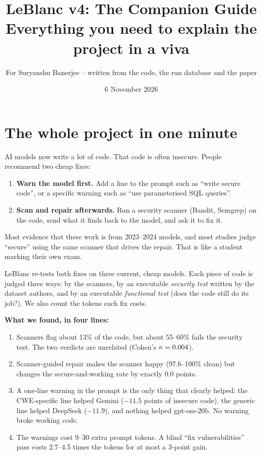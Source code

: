 \documentclass[11pt]{article}
\title{LeBlanc v4: The Companion Guide\\[0.3em]\large Everything you need to explain the project in a viva}
\author{For Suryanshu Banerjee \;--\; written from the code, the run database and the paper}
\date{6 November 2026}
\begin{document}
\maketitle
\tableofcontents
\newpage

\section{The whole project in one minute}
AI models now write a lot of code. That code is often insecure. People recommend two cheap fixes:
\begin{enumerate}
\item \textbf{Warn the model first.} Add a line to the prompt such as ``write secure code'', or a specific warning
      such as ``use parameterised SQL queries''.
\item \textbf{Scan and repair afterwards.} Run a security scanner (Bandit, Semgrep) on the code, send what it
      finds back to the model, and ask it to fix it.
\end{enumerate}
Most evidence that these work is from 2023--2024 models, and most studies judge ``secure'' using the same scanner
that drives the repair. That is like a student marking their own exam.

LeBlanc re-tests both fixes on three current, cheap models. Each piece of code is judged three ways: by the
scanners, by an executable \emph{security test} written by the dataset authors, and by an executable
\emph{functional test} (does the code still do its job?). We also count the tokens each fix costs.

\textbf{What we found, in four lines:}
\begin{enumerate}
\item Scanners flag about 13\% of the code, but about 55--60\% fails the security test. The two verdicts are
      unrelated (Cohen's $\kappa=0.004$).
\item Scanner-guided repair makes the scanner happy (97.6--100\% clean) but changes the secure-and-working rate by
      exactly 0.0 points.
\item A one-line warning in the prompt is the only thing that clearly helped: the CWE-specific line helped Gemini
      ($-11.5$ points of insecure code), the generic line helped DeepSeek ($-11.9$), and nothing helped
      gpt-oss-20b. No warning broke working code.
\item The warnings cost 9--30 extra prompt tokens. A blind ``fix vulnerabilities'' pass costs 2.7--4.5 times the
      tokens for at most a 3-point gain.
\end{enumerate}
\end{document}
